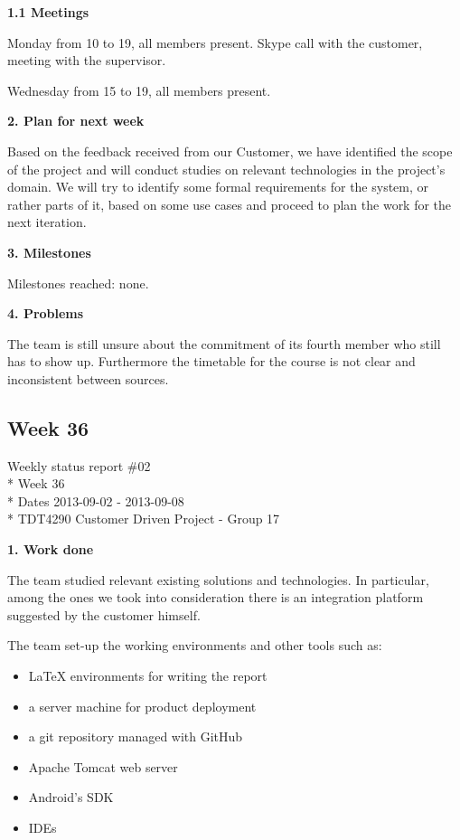 \textbf{1.1 Meetings}

Monday
from 10 to 19, all members present.
Skype call with the customer, meeting with the supervisor.

Wednesday
from 15 to 19, all members present.

\textbf{2. Plan for next week}

Based on the feedback received from our Customer, we have identified the scope of the project and will conduct studies on relevant technologies in the project’s domain. We will try to identify some formal requirements
for the system, or rather parts of it, based on some use cases and proceed to plan the work for the next iteration.

\textbf{3. Milestones}

Milestones reached: none.

\textbf{4. Problems}

The team is still unsure about the commitment of its fourth member
who still has to show up. Furthermore the timetable for the course
is not clear and inconsistent between sources.

\newpage
\subsection{Week 36}

\begin{center}
Weekly status report \#02\\*
Week 36 \\*
Dates 2013-09-02 - 2013-09-08 \\*
TDT4290 Customer Driven Project - Group 17
\end{center}

\textbf{1. Work done}

The team studied relevant existing solutions and technologies.
In particular, among the ones we took into consideration there is an integration platform suggested by the customer himself.

The team set-up the working environments and other tools such as:
\begin{itemize}
\item LaTeX environments for writing the report
\item a server machine for product deployment
\item a git repository managed with GitHub
\item Apache Tomcat web server
\item Android’s SDK
\item IDEs
\end{itemize}

